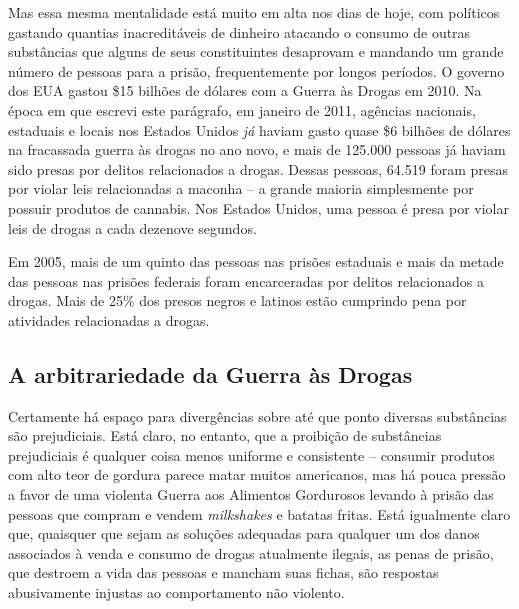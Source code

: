 Mas essa mesma mentalidade está muito em alta nos dias de hoje, com políticos gastando quantias inacreditáveis de dinheiro atacando o consumo de outras substâncias que alguns de seus constituintes desaprovam e mandando um grande número de pessoas para a prisão, frequentemente por longos períodos. O governo dos EUA gastou \$15 bilhões de dólares com a Guerra às Drogas em 2010. Na época em que escrevi este parágrafo, em janeiro de 2011, agências nacionais, estaduais e locais nos Estados Unidos \emph{já} haviam gasto quase \$6 bilhões de dólares na fracassada guerra às drogas no ano novo, e mais de 125.000 pessoas já haviam sido presas por delitos relacionados a drogas. Dessas pessoas, 64.519 foram presas por violar leis relacionadas a maconha -- a grande maioria simplesmente por possuir produtos de cannabis. Nos Estados Unidos, uma pessoa é presa por violar leis de drogas a cada dezenove segundos.

Em 2005, mais de um quinto das pessoas nas prisões estaduais e mais da metade das pessoas nas prisões federais foram encarceradas por delitos relacionados a drogas. Mais de 25\% dos presos negros e latinos estão cumprindo pena por atividades relacionadas a drogas.

\subsection*{A arbitrariedade da Guerra às Drogas}

Certamente há espaço para divergências sobre até que ponto diversas substâncias são prejudiciais. Está claro, no entanto, que a proibição de substâncias prejudiciais é qualquer coisa menos uniforme e consistente -- consumir produtos com alto teor de gordura parece matar muitos americanos, mas há pouca pressão a favor de uma violenta Guerra aos Alimentos Gordurosos levando à prisão das pessoas que compram e vendem \emph{milkshakes} e batatas fritas. Está igualmente claro que, quaisquer que sejam as soluções adequadas para qualquer um dos danos associados à venda e consumo de drogas atualmente ilegais, as penas de prisão, que destroem a vida das pessoas e mancham suas fichas, são respostas abusivamente injustas ao comportamento não violento.

